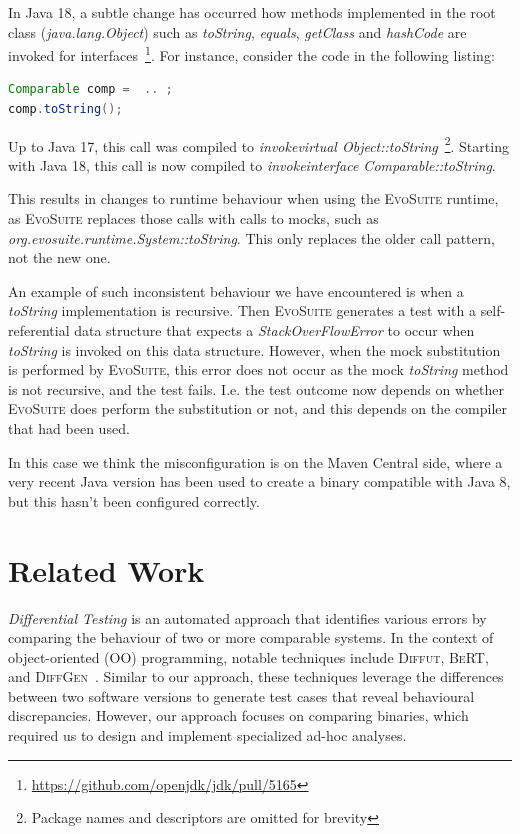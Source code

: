 \documentclass[conference]{IEEEtran}
\makeatletter
\newcommand{\evosuite}{\textsc{EvoSuite}\@\xspace}
\makeatother
\begin{document}
In Java 18, a subtle change has occurred   how methods implemented in the root class (\textit{java.lang.Object}) such as \textit{toString}, \textit{equals}, \textit{getClass} and \textit{hashCode} are invoked for interfaces~\footnote{\url{https://github.com/openjdk/jdk/pull/5165}}.
For instance, consider the code in the following listing:

\begin{lstlisting}[language=Java]
Comparable comp =  .. ; 
comp.toString();
\end{lstlisting}	

Up to Java 17, this call was compiled to \textit{invokevirtual Object::toString}~\footnote{Package names and descriptors are omitted for brevity}. Starting with Java 18, this call is now compiled to \textit{invokeinterface Comparable::toString}.

This results in changes to runtime behaviour when using the \evosuite runtime, as \evosuite replaces those calls with calls to mocks, such as  \textit{org.evosuite.runtime.System::toString}. This only replaces the older call pattern, not the new one. 

An example of such inconsistent behaviour we have encountered  is when a \textit{toString} implementation is recursive. Then \evosuite generates a test with a self-referential data structure that expects a \textit{StackOverFlowError} to occur when \textit{toString} is invoked on this data structure. However, when the mock substitution is performed by \evosuite, this error does not occur as the mock \textit{toString} method is not recursive, and the test fails. I.e. the test outcome now depends on whether \evosuite does perform the substitution or not, and this depends on the compiler that had been used.

In this case we think the misconfiguration is on the Maven Central side, where a very recent Java version has been used to create a binary compatible with Java 8, but this hasn't been configured correctly.






\section{Related Work}
\label{sec:relatedwork}

\emph{Differential Testing}\cite{difftesting} is an automated approach that identifies various errors by comparing the behaviour of two or more comparable systems\cite{xie2007towards,jin10:automated,diffgen}. In the context of object-oriented (OO) programming, notable techniques include \textsc{Diffut}\cite{xie2007towards}, \textsc{BeRT}\cite{jin10:automated}, and \textsc{DiffGen}~\cite{diffgen}. Similar to our approach, these techniques leverage the differences between two software versions to generate test cases that reveal behavioural discrepancies. However, our approach focuses on comparing binaries, which required us to design and implement specialized ad-hoc analyses.
\end{document}
